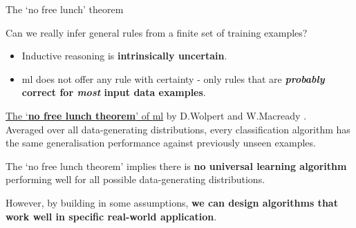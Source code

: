 
\begin{frame}[t]{The `no free lunch' theorem}

Can we really infer general rules from a finite set of training examples?
\begin{itemize}
  \item Inductive reasoning is {\bf intrinsically uncertain}.
  \item \gls{ml} does not offer any rule with certainty - 
  only rules that are {\bf {\em probably} correct for {\em most} input data examples}.
\end{itemize}

\vspace{0.1cm}

\begin{blockexample}{}
\underline{The `{\bf no free lunch theorem}' of  \gls{ml}} 
by D.Wolpert and W.Macready \cite{NoFreeLunch}.\\
\vspace{0.2cm}
{\small
Averaged over all data-generating distributions,
every classification algorithm has the same generalisation performance
against previously unseen examples.\\
}
\end{blockexample}

\vspace{0.1cm}

The `no free lunch theorem' implies there is 
{\bf no universal learning algorithm} 
performing well for all possible data-generating distributions.

\vspace{0.2cm}

However, by building in some assumptions,
{\bf we can design algorithms that work well in specific real-world application}.

\end{frame}
